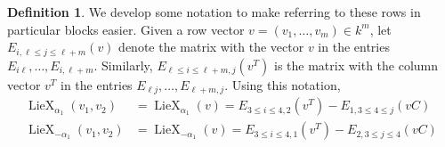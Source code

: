 \documentclass[12pt]{article}
\theoremstyle{definition}
\newtheorem{definition}[theorem]{Definition}
\numberwithin{theorem}{subsection}
\DeclareMathOperator{\LieX}{LieX}
\begin{document}
\begin{definition}
We develop some notation to make referring to these rows in particular blocks easier. Given a row vector $v = (v_1, \ldots, v_{m}) \in k^{m}$, let $E_{i,\ell \le j \le \ell+m}(v)$ denote the matrix with the vector $v$ in the entries $E_{i\ell}, \ldots, E_{i, \ell+m}$. Similarly, $E_{\ell \le i \le \ell+m, j}(v^T)$ is the matrix with the column vector $v^T$ in the entries $E_{\ell j}, \ldots, E_{\ell+m,j}$. Using this notation,
\begin{align*}
	\LieX_{\alpha_1}(v_1, v_2) &= \LieX_{\alpha_1}(v) = E_{3 \le i \le 4, 2}(v^T) - E_{1, 3 \le 4 \le j}( vC) \\
	\LieX_{-\alpha_1}(v_1, v_2) &= \LieX_{-\alpha_1}(v) = E_{3 \le i \le 4, 1} (v^T) - E_{2, 3 \le j \le 4} ( vC)
\end{align*}
\end{definition}
\end{document}
